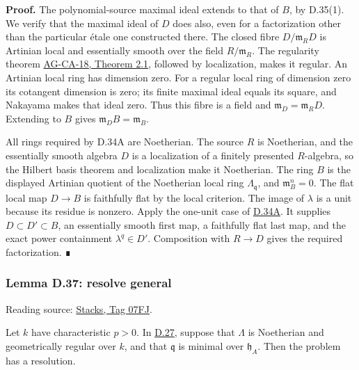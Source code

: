 \documentclass[11pt,a4paper,openany]{report}
\begin{document}
\textbf{Proof.} The polynomial-source maximal ideal extends to that of \(B\), by D.35(1). We verify that the maximal ideal of \(D\) does also, even for a factorization other than the particular étale one constructed there. The closed fibre \(D/\mathfrak m_RD\) is Artinian local and essentially smooth over the field \(R/\mathfrak m_R\). The regularity theorem \href{https://github.com/KokunoYumeto/open-math-courses/blob/d02d0a3669f42579db037cd44de1d113fdd770a1/docs/courses/AG-CA/src/smooth-algebras-over-a-field-and-the-jacobian-criterion.md}{AG-CA-18, Theorem 2.1}, followed by localization, makes it regular. An Artinian local ring has dimension zero. For a regular local ring of dimension zero its cotangent dimension is zero; its finite maximal ideal equals its square, and Nakayama makes that ideal zero. Thus this fibre is a field and \(\mathfrak m_D=\mathfrak m_RD\). Extending to \(B\) gives \(\mathfrak m_DB=\mathfrak m_B\).

All rings required by D.34A are Noetherian. The source \(R\) is Noetherian, and the essentially smooth algebra \(D\) is a localization of a finitely presented \(R\)-algebra, so the Hilbert basis theorem and localization make it Noetherian. The ring \(B\) is the displayed Artinian quotient of the Noetherian local ring \(\Lambda_{\mathfrak q}\), and \(\mathfrak m_B^n=0\). The flat local map \(D\to B\) is faithfully flat by the local criterion. The image of \(\lambda\) is a unit because its residue is nonzero. Apply the one-unit case of \hyperref[AG-RG-S05-smoothing-artinian-denominator-enlargement]{D.34A}. It supplies \(D\subset D'\subset B\), an essentially smooth first map, a faithfully flat last map, and the exact power containment \(\lambda^q\in D'\). Composition with \(R\to D\) gives the required factorization. ∎

\label{AG-RG-S05-smoothing-lemma-resolve-general}

\subsubsection{Lemma D.37: resolve general}\label{AG-RG-S05-lemma-d.37-resolve-general}

Reading source: \href{https://stacks.math.columbia.edu/tag/07FJ}{Stacks, Tag 07FJ}.

Let \(k\) have characteristic \(p>0\). In \hyperref[AG-RG-S05-smoothing-situation-local]{D.27}, suppose that \(\Lambda\) is Noetherian and geometrically regular over \(k\), and that \(\mathfrak q\) is minimal over \(\mathfrak h_A\). Then the problem has a resolution.
\end{document}
